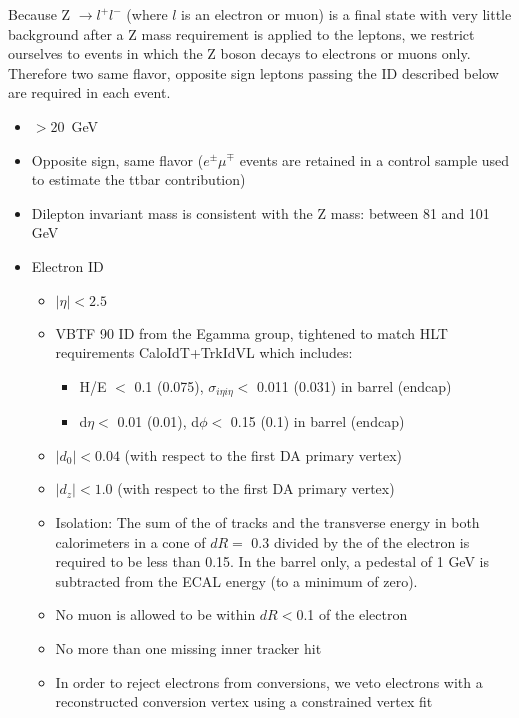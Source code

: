 Because Z $\rightarrow l^+l^-$ (where $l$ is an electron or muon) is a final state with very little 
background after a Z mass requirement is applied to the leptons,
we restrict ourselves to events in which the Z boson decays to electrons or muons only.
Therefore two same flavor, opposite sign leptons passing the ID described below are required in each event.

\begin{itemize}
\item \pt $> 20$~GeV
\item Opposite sign, same flavor ($e^\pm\mu^\mp$ events are retained in a control 
  sample used to estimate the ttbar contribution)
\item Dilepton invariant mass is consistent with the Z mass: between 81 and 101 GeV


\item Electron ID
  \begin{itemize}
  \item $|\eta| < 2.5$
  \item VBTF 90 ID from the Egamma group\cite{ref:vbtf}, 
	tightened to match HLT requirements CaloIdT+TrkIdVL which includes: \cite{ref:eghlt}
	\begin{itemize}
	\item H/E $<$ 0.1 (0.075), $\sigma_{i\eta i\eta} <$ 0.011 (0.031) in barrel (endcap)
	\item d$\eta <$ 0.01 (0.01), d$\phi <$ 0.15 (0.1) in barrel (endcap)
	\end{itemize}
  \item $|d_0| <0.04$ (with respect to the first DA primary vertex)
  \item $|d_z| <1.0$ (with respect to the first DA primary vertex)
  \item Isolation: The sum of the \pt of tracks and the transverse energy in both calorimeters in a cone of $dR =$ 0.3 divided by the \pt of the electron is required to be less than 0.15. In the barrel only, a pedestal of 1 GeV is subtracted from the ECAL energy (to a minimum of zero).
  \item No muon is allowed to be within $dR < $0.1 of the electron
  \item No more than one missing inner tracker hit \cite{ref:sntconv}
  \item In order to reject electrons from conversions, we veto electrons with a reconstructed conversion vertex using a constrained vertex fit \cite{ref:borisconv}


\end{itemize}
\end{itemize}
